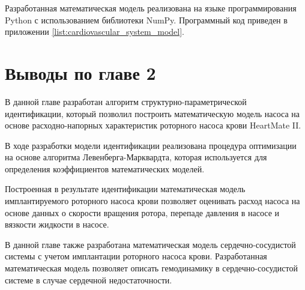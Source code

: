 Разработанная математическая модель реализована на языке программирования Python с использованием библиотеки NumPy. Программный код приведен в приложении \ref{list:cardiovascular_system_model}. 

\section*{Выводы по главе 2} 

В данной главе разработан алгоритм структурно-параметрической идентификации, который позволил построить математическую модель насоса на основе расходно-напорных характеристик роторного насоса крови HeartMate II. 

В ходе разработки модели идентификации реализована процедура оптимизации на основе алгоритма Левенберга-Марквардта, которая используется для определения коэффициентов математических моделей. 

Построенная в результате идентификации математическая модель имплантируемого роторного насоса крови позволяет оценивать расход насоса на основе данных о скорости вращения ротора, перепаде давления в насосе и вязкости жидкости в насосе.

В данной главе также разработана математическая модель сердечно-сосудистой системы с учетом имплантации роторного насоса крови. Разработанная математическая модель позволяет описать гемодинамику в сердечно-сосудистой системе в случае сердечной недостаточности. 
